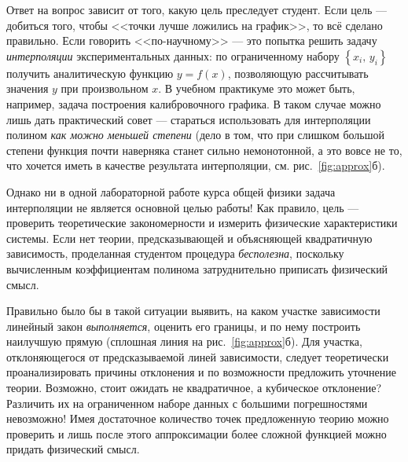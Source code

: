 {\footnotesize
Ответ на вопрос зависит от того, какую цель преследует
студент. Если цель --- добиться того, чтобы <<точки
лучше ложились на график>>, то всё сделано правильно.
Если говорить <<по-научному>> ---
это попытка решить задачу \emph{интерполяции}
экспериментальных данных: по ограниченному набору $\left\{ x_{i},\,y_{i}\right\} $
получить аналитическую функцию $y=f\!\left(x\right)$, позволяющую
рассчитывать значения $y$ при произвольном $x$. В учебном практикуме
это может быть, например, задача построения калибровочного графика.
В таком случае можно лишь дать практический совет --- стараться
использовать для интерполяции полином \emph{как можно
меньшей степени} (дело в том, что при слишком большой
степени функция почти наверняка станет сильно немонотонной, а это
вовсе не то, что хочется иметь в качестве результата интерполяции,
см. рис.~\ref{fig:approx}б).

Однако ни в одной лабораторной работе курса общей
физики задача интерполяции не является основной целью работы! Как
правило, цель --- проверить теоретические закономерности
и измерить физические характеристики системы. Если нет теории, предсказывающей
и объясняющей квадратичную зависимость, проделанная студентом процедура
\emph{бесполезна}, поскольку вычисленным коэффициентам полинома затруднительно 
приписать физический смысл.

Правильно было бы в такой ситуации выявить, на каком
участке зависимости линейный закон \emph{выполняется},
оценить его границы, и по нему построить наилучшую прямую (сплошная
линия на рис.~\ref{fig:approx}б). Для участка, отклоняющегося от
предсказываемой линей зависимости, следует теоретически проанализировать
причины отклонения и по возможности предложить уточнение теории. Возможно,
стоит ожидать не квадратичное, а кубическое отклонение? Различить
их на ограниченном наборе данных с большими погрешностями невозможно!
Имея достаточное количество точек предложенную теорию можно проверить
и лишь после этого аппроксимации более сложной функцией можно придать
физический смысл.\par
}%